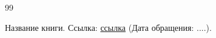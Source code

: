 \begin{thebibliography}{99}

 Название книги. 
Ссылка: \href{ссылка}{ссылка} 
(Дата обращения: ....).


\end{thebibliography}


